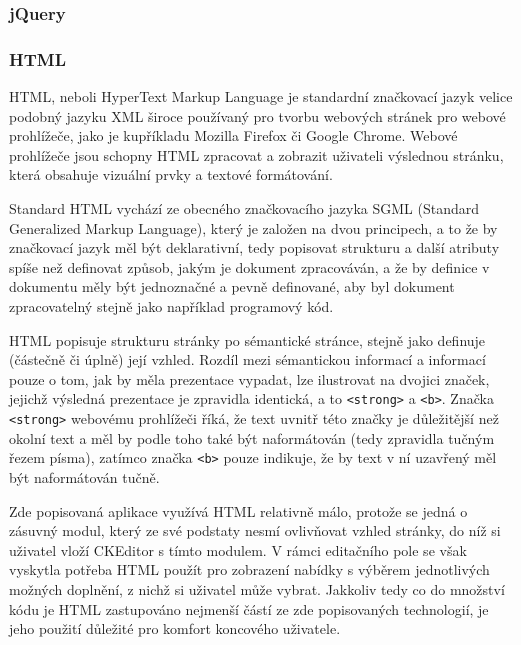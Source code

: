 \documentclass[a4paper,11pt]{article}
\begin{document}

\subsubsection{jQuery}


\subsubsection{HTML}

HTML, neboli HyperText Markup Language je standardní značkovací jazyk velice podobný jazyku XML široce používaný pro tvorbu webových stránek pro webové prohlížeče, jako je kupříkladu Mozilla Firefox či Google Chrome. Webové prohlížeče jsou schopny HTML zpracovat a zobrazit uživateli výslednou stránku, která obsahuje vizuální prvky a textové formátování. 

Standard HTML vychází ze obecného značkovacího jazyka SGML (Standard Generalized Markup Language), který je založen na dvou principech, a to že by značkovací jazyk měl být deklarativní, tedy popisovat strukturu a další atributy spíše než definovat způsob, jakým je dokument zpracováván, a že by definice v dokumentu měly být jednoznačné a pevně definované, aby byl dokument zpracovatelný stejně jako například programový kód. %


HTML popisuje strukturu stránky po sémantické stránce, stejně jako definuje (částečně či úplně) její vzhled. Rozdíl mezi sémantickou informací a informací pouze o tom, jak by měla prezentace vypadat, lze ilustrovat na dvojici značek, jejichž výsledná prezentace je zpravidla identická, a to {\tt <strong>} a {\tt <b>}. Značka {\tt <strong>} webovému prohlížeči říká, že text uvnitř této značky je důležitější než okolní text a měl by podle toho také být naformátován (tedy zpravidla tučným řezem písma), zatímco značka {\tt <b>} pouze indikuje, že by text v ní uzavřený měl být naformátován tučně. %


Zde popisovaná aplikace využívá HTML relativně málo, protože se jedná o zásuvný modul, který ze své podstaty nesmí ovlivňovat vzhled stránky, do níž si uživatel vloží CKEditor s tímto modulem. V rámci editačního pole se však vyskytla potřeba HTML použít pro zobrazení nabídky s výběrem jednotlivých možných doplnění, z nichž si uživatel může vybrat. Jakkoliv tedy co do množství kódu je HTML zastupováno nejmenší částí ze zde popisovaných technologií, je jeho použití důležité pro komfort koncového uživatele.
\end{document}
